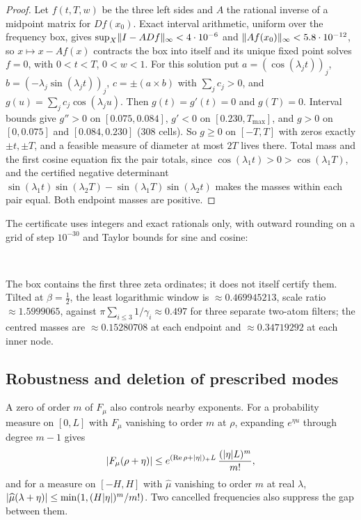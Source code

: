 \begin{proof}
Let $f(t,T,w)$ be the three left sides and $A$ the rational inverse of a midpoint matrix for $Df(x_0)$.
Exact interval arithmetic, uniform over the frequency box, gives $\sup_X\lVert I-ADf\rVert_\infty<4\cdot10^{-6}$
and $\lVert Af(x_0)\rVert_\infty<5.8\cdot10^{-12}$, so $x\mapsto x-Af(x)$ contracts the box into itself and its
unique fixed point solves $f=0$, with $0<t<T$, $0<w<1$. For this solution put
$a=(\cos(\lambda_jt))_j$, $b=(-\lambda_j\sin(\lambda_jt))_j$, $c=\pm(a\times b)$ with $\sum_jc_j>0$, and
$g(u)=\sum_jc_j\cos(\lambda_ju)$. Then $g(t)=g'(t)=0$ and $g(T)=0$. Interval bounds give $g''>0$ on
$[0.075,0.084]$, $g'<0$ on $[0.230,T_{\max}]$, and $g>0$ on $[0,0.075]$ and $[0.084,0.230]$ (308 cells).
So $g\ge0$ on $[-T,T]$ with zeros exactly $\pm t,\pm T$, and a feasible measure of diameter at most $2T$
lives there. Total mass and the first cosine equation fix the pair totals, since
$\cos(\lambda_1t)>0>\cos(\lambda_1T)$, and the certified negative determinant
$\sin(\lambda_1t)\sin(\lambda_2T)-\sin(\lambda_1T)\sin(\lambda_2t)$ makes the masses within each pair equal.
Both endpoint masses are positive.
\end{proof}

The certificate uses integers and exact rationals only, with outward rounding on a grid of step
$10^{-30}$ and Taylor bounds for sine and cosine:
\begin{center}\\
\end{center}
The box contains the first three zeta ordinates;
it does not itself certify them. Tilted at $\beta=\tfrac12$, the least logarithmic window is
$\approx0.469945213$, scale ratio $\approx1.5999065$, against $\pi\sum_{i\le3}1/\gamma_i\approx0.497$ for three
separate two-atom filters; the centred masses are $\approx0.15280708$ at each endpoint and
$\approx0.34719292$ at each inner node.

\subsection{Robustness and deletion of prescribed modes}\label{fil:sec:robust}

A zero of order $m$ of $F_\mu$ also controls nearby exponents. For a probability measure on $[0,L]$
with $F_\mu$ vanishing to order $m$ at $\rho$, expanding $e^{\eta u}$ through degree $m-1$ gives
\begin{equation}\label{fil:eq:taylor}
 \lvert F_\mu(\rho+\eta)\rvert\le e^{(\operatorname{Re}\rho+\lvert\eta\rvert)_+L}\,\frac{(\lvert\eta\rvert L)^m}{m!},
\end{equation}
and for a measure on $[-H,H]$ with $\widehat\mu$ vanishing to order $m$ at real $\lambda$,
$\lvert\widehat\mu(\lambda+\eta)\rvert\le\min(1,(H\lvert\eta\rvert)^m/m!)$. Two cancelled frequencies also suppress the gap
between them.

